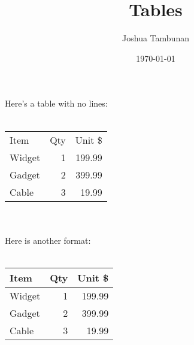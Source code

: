 \documentclass[]{article}
\title{Tables}
\author{Joshua Tambunan}
\date{\today}
\begin{document}
\maketitle

Here's a table with no lines:\\~\\
\begin{tabular}{lrr} %
    Item    & Qty   & Unit \$   \\
    Widget  & 1     & 199.99    \\
    Gadget  & 2     & 399.99    \\
    Cable   & 3     & 19.99
\end{tabular}\\~\\

Here is another format:\\~\\
\begin{tabular}{|l|r|r|} \hline
    Item    & Qty   & Unit \$   \\\hline
    Widget  & 1     & 199.99    \\
    Gadget  & 2     & 399.99    \\
    Cable   & 3     & 19.99     \\\hline
\end{tabular}
\end{document}
